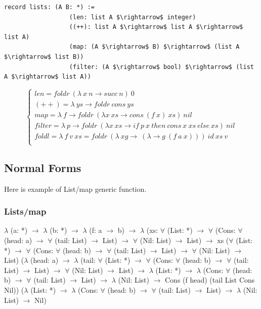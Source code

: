 \documentclass[11pt,oneside]{article}
\begin{document}
\begin{lstlisting}[mathescape=true]
           record lists: (A B: *) :=
                  (len: list A $\rightarrow$ integer)
                  ((++): list A $\rightarrow$ list A $\rightarrow$ list A)
                  (map: (A $\rightarrow$ B) $\rightarrow$ (list A $\rightarrow$ list B))
                  (filter: (A $\rightarrow$ bool) $\rightarrow$ (list A $\rightarrow$ list A))
\end{lstlisting}
$$
\begin{cases}
len = foldr\ (\lambda\ x\ n \rightarrow succ\ n)\ 0\\
(++) = \lambda\ ys \rightarrow foldr\ cons\ ys\\
map = \lambda\ f \rightarrow foldr\ (\lambda x\ xs \rightarrow cons\ (f\ x)\ xs)\ nil\\
filter = \lambda\ p \rightarrow foldr\ (\lambda x\ xs \rightarrow if\ p\ x\ then\ cons\ x\ xs\ else\ xs)\ nil\\
foldl = \lambda\ f\ v\ xs = foldr\ (\lambda\ xg\rightarrow\ (\lambda \rightarrow g\ (f\ a\ x)))\ id\ xs\ v\\
\end{cases}
$$

\vspace{1cm}
\subsection{Normal Forms}

Here is example of List/map generic function.

\subsubsection*{Lists/map}
{\selectfont
\vspace{0.5cm}
$\lambda$ (a: *) $\rightarrow$ $\lambda$ (b: *) $\rightarrow$ $\lambda$ (f: a $\rightarrow$ b) $\rightarrow$ $\lambda$ (xs: $\forall$ (List: *)
$\rightarrow$ $\forall$ (Cons: $\forall$ (head: a) $\rightarrow$ $\forall$ (tail: List) $\rightarrow$ List) $\rightarrow$ $\forall$ (Nil: List) $\rightarrow$ List)
$\rightarrow$ xs ($\forall$ (List: *) $\rightarrow$ $\forall$ (Cons: $\forall$ (head: b) $\rightarrow$ $\forall$ (tail: List) $\rightarrow$ List)
$\rightarrow$ $\forall$ (Nil: List) $\rightarrow$ List) ($\lambda$ (head: a) $\rightarrow$ $\lambda$ (tail: $\forall$ (List: *) $\rightarrow$
$\forall$ (Cons: $\forall$ (head: b) $\rightarrow$ $\forall$ (tail: List) $\rightarrow$ List) $\rightarrow$ $\forall$ (Nil: List)
$\rightarrow$ List) $\rightarrow$ $\lambda$ (List: *) $\rightarrow$ $\lambda$ (Cons: $\forall$ (head: b) $\rightarrow$ $\forall$
(tail: List) $\rightarrow$ List) $\rightarrow$ $\lambda$ (Nil: List) $\rightarrow$ Cons (f head) (tail List Cons Nil))
($\lambda$ (List: *) $\rightarrow$ $\lambda$ (Cons: $\forall$ (head: b) $\rightarrow$ $\forall$ (tail: List) $\rightarrow$
List) $\rightarrow$ $\lambda$ (Nil: List) $\rightarrow$ Nil)
}
\end{document}
